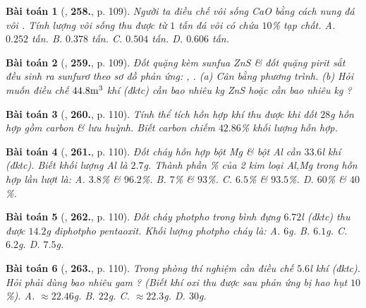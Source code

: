\documentclass{article}
\numberwithin{equation}{section}
\newtheorem{baitoan}{Bài toán}
\begin{document}
\begin{baitoan}[\cite{An_400_BT_Hoa_Hoc_8_2020}, \textbf{258.}, p. 109]
	Người ta điều chế vôi sống \emph{CaO} bằng cách nung đá vôi \emph{}. Tính lượng vôi sống thu được từ $1$ tấn đá vôi có chứa $10$\% tạp chất. {\sf A.} $0.252$ tấn. {\sf B.} $0.378$ tấn. {\sf C.} $0.504$ tấn. {\sf D.} $0.606$ tấn.
\end{baitoan}

\begin{baitoan}[\cite{An_400_BT_Hoa_Hoc_8_2020}, \textbf{259.}, p. 109]
	Đốt quặng kèm sunfua \emph{ZnS} \& đốt quặng pirit sắt \emph{} đều sinh ra sunfurơ \emph{} theo sơ đồ phản ứng: \emph{}, \emph{}. (a) Cân bằng phương trình. (b) Hỏi muốn điều chế $44.8\rm m^3$ khí \emph{} (đktc) cần bao nhiêu \emph{kg ZnS} hoặc cần bao nhiêu \emph{kg }?
\end{baitoan}

\begin{baitoan}[\cite{An_400_BT_Hoa_Hoc_8_2020}, \textbf{260.}, p. 110]
	Tính thể tích hỗn hợp khí thu được khi đốt $28$\emph{g} hỗn hợp gồm carbon \& lưu huỳnh. Biết carbon chiếm $42.86$\% khối lượng hỗn hợp.
\end{baitoan}

\begin{baitoan}[\cite{An_400_BT_Hoa_Hoc_8_2020}, \textbf{261.}, p. 110]
	Đốt cháy hỗn hợp bột \emph{Mg} \& bột \emph{Al} cần $33.6$\emph{l} khí \emph{} (đktc). Biết khối lượng \emph{Al} là $2.7$\emph{g}. Thành phần \% của 2 kim loại \emph{Al,Mg} trong hỗn hợp lần lượt là: {\sf A.} $3.8$\% \& $96.2$\%. {\sf B.} $7$\% \& $93$\%. {\sf C.} $6.5$\% \& $93.5$\%. {\sf D.} $60$\% \& $40$\%.
\end{baitoan}

\begin{baitoan}[\cite{An_400_BT_Hoa_Hoc_8_2020}, \textbf{262.}, p. 110]
	Đốt cháy photpho trong bình đựng $6.72$\emph{l } (đktc) thu được $14.2$\emph{g} điphotpho pentaoxit. Khối lượng photpho cháy là: {\sf A.} $6$\emph{g}. {\sf B.} $6.1$\emph{g}. {\sf C.} $6.2$\emph{g}. {\sf D.} $7.5$\emph{g}.
\end{baitoan}

\begin{baitoan}[\cite{An_400_BT_Hoa_Hoc_8_2020}, \textbf{263.}, p. 110]
	Trong phòng thí nghiệm cần điều chế $5.6$\emph{l} khí \emph{} (đktc). Hỏi phải dùng bao nhiêu gam \emph{}? (Biết khí oxi thu được sau phản ứng bị hao hụt $10$\%). {\sf A.} $\approx22.46$\emph{g}. {\sf B.} $22$\emph{g}. {\sf C.} $\approx22.3$\emph{g}. {\sf D.} $30$\emph{g}.
\end{baitoan}
\end{document}
